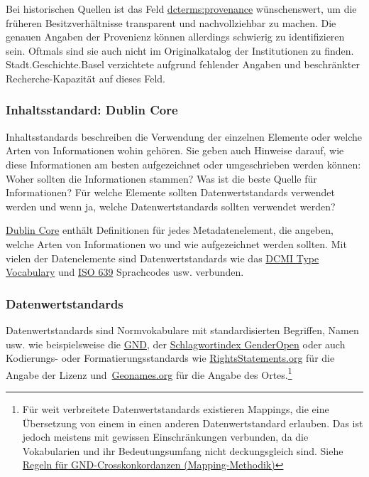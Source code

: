 \documentclass[
  letterpaper,
  DIV=11,
  numbers=noendperiod]{scrartcl}
\begin{document}
Bei historischen Quellen ist das Feld
\href{https://www.dublincore.org/specifications/dublin-core/dcmi-terms/terms/provenance/}{dcterms:provenance}
wünschenswert, um die früheren Besitzverhältnisse transparent und
nachvollziehbar zu machen. Die genauen Angaben der Provenienz können
allerdings schwierig zu identifizieren sein. Oftmals sind sie auch nicht
im Originalkatalog der Institutionen zu finden. Stadt.Geschichte.Basel
verzichtete aufgrund fehlender Angaben und beschränkter
Recherche-Kapazität auf dieses Feld.

\subsubsection{Inhaltsstandard: Dublin
Core}\label{inhaltsstandard-dublin-core}

Inhaltsstandards beschreiben die Verwendung der einzelnen Elemente oder
welche Arten von Informationen wohin gehören. Sie geben auch Hinweise
darauf, wie diese Informationen am besten aufgezeichnet oder
umgeschrieben werden können: Woher sollten die Informationen stammen?
Was ist die beste Quelle für Informationen? Für welche Elemente sollten
Datenwertstandards verwendet werden und wenn ja, welche
Datenwertstandards sollten verwendet werden?

\href{https://www.dublincore.org}{Dublin Core} enthält Definitionen für
jedes Metadatenelement, die angeben, welche Arten von Informationen wo
und wie aufgezeichnet werden sollten. Mit vielen der Datenelemente sind
Datenwertstandards wie das
\href{https://www.dublincore.org/specifications/dublin-core/dcmi-type-vocabulary/}{DCMI
Type Vocabulary} und
\href{https://www.iso.org/iso-639-language-codes.html}{ISO 639}
Sprachcodes usw. verbunden.

\subsubsection{Datenwertstandards}\label{datenwertstandards}

Datenwertstandards sind Normvokabulare mit standardisierten Begriffen,
Namen usw. wie beispielsweise die \href{https://gnd.network/}{GND}, der
\href{https://opengenderplatform.de/schlagwortindex}{Schlagwortindex
GenderOpen} oder auch Kodierungs- oder Formatierungsstandards wie
\href{http://rightsstatements.org}{RightsStatements.org} für die Angabe
der Lizenz und~\href{https://www.geonames.org/}{Geonames.org} für die
Angabe des Ortes.\footnote{Für weit verbreitete Datenwertstandards
  existieren Mappings, die eine Übersetzung von einem in einen anderen
  Datenwertstandard erlauben. Das ist jedoch meistens mit gewissen
  Einschränkungen verbunden, da die Vokabularien und ihr
  Bedeutungsumfang nicht deckungsgleich sind. Siehe
  \href{https://wiki.dnb.de/pages/viewpage.action?pageId=263851113}{Regeln
  für GND-Crosskonkordanzen (Mapping-Methodik)}}
\end{document}
